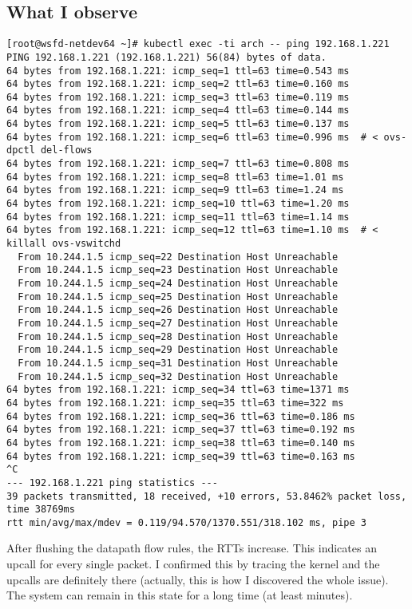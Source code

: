 \subsection{What I observe}


\begin{verbatim}
[root@wsfd-netdev64 ~]# kubectl exec -ti arch -- ping 192.168.1.221
PING 192.168.1.221 (192.168.1.221) 56(84) bytes of data.
64 bytes from 192.168.1.221: icmp_seq=1 ttl=63 time=0.543 ms
64 bytes from 192.168.1.221: icmp_seq=2 ttl=63 time=0.160 ms
64 bytes from 192.168.1.221: icmp_seq=3 ttl=63 time=0.119 ms
64 bytes from 192.168.1.221: icmp_seq=4 ttl=63 time=0.144 ms
64 bytes from 192.168.1.221: icmp_seq=5 ttl=63 time=0.137 ms
64 bytes from 192.168.1.221: icmp_seq=6 ttl=63 time=0.996 ms  # < ovs-dpctl del-flows
64 bytes from 192.168.1.221: icmp_seq=7 ttl=63 time=0.808 ms
64 bytes from 192.168.1.221: icmp_seq=8 ttl=63 time=1.01 ms
64 bytes from 192.168.1.221: icmp_seq=9 ttl=63 time=1.24 ms
64 bytes from 192.168.1.221: icmp_seq=10 ttl=63 time=1.20 ms
64 bytes from 192.168.1.221: icmp_seq=11 ttl=63 time=1.14 ms
64 bytes from 192.168.1.221: icmp_seq=12 ttl=63 time=1.10 ms  # < killall ovs-vswitchd
  From 10.244.1.5 icmp_seq=22 Destination Host Unreachable
  From 10.244.1.5 icmp_seq=23 Destination Host Unreachable
  From 10.244.1.5 icmp_seq=24 Destination Host Unreachable
  From 10.244.1.5 icmp_seq=25 Destination Host Unreachable
  From 10.244.1.5 icmp_seq=26 Destination Host Unreachable
  From 10.244.1.5 icmp_seq=27 Destination Host Unreachable
  From 10.244.1.5 icmp_seq=28 Destination Host Unreachable
  From 10.244.1.5 icmp_seq=29 Destination Host Unreachable
  From 10.244.1.5 icmp_seq=31 Destination Host Unreachable
  From 10.244.1.5 icmp_seq=32 Destination Host Unreachable
64 bytes from 192.168.1.221: icmp_seq=34 ttl=63 time=1371 ms
64 bytes from 192.168.1.221: icmp_seq=35 ttl=63 time=322 ms
64 bytes from 192.168.1.221: icmp_seq=36 ttl=63 time=0.186 ms
64 bytes from 192.168.1.221: icmp_seq=37 ttl=63 time=0.192 ms
64 bytes from 192.168.1.221: icmp_seq=38 ttl=63 time=0.140 ms
64 bytes from 192.168.1.221: icmp_seq=39 ttl=63 time=0.163 ms
^C
--- 192.168.1.221 ping statistics ---
39 packets transmitted, 18 received, +10 errors, 53.8462% packet loss, time 38769ms
rtt min/avg/max/mdev = 0.119/94.570/1370.551/318.102 ms, pipe 3
\end{verbatim}

After flushing the datapath flow rules, the RTTs increase. This indicates an upcall for every single packet. I confirmed this by tracing the kernel and the upcalls are definitely there (actually, this is how I discovered the whole issue). The system can remain in this state for a long time (at least minutes).

